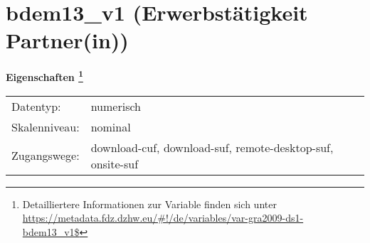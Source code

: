 
    \setcounter{footnote}{0}

    \vspace*{-1.8cm}
	\section{bdem13\_v1 (Erwerbstätigkeit Partner(in))}
	\label{section:bdem13_v1}



    \vspace*{0.5cm}
    \noindent\textbf{Eigenschaften
	\footnote{Detailliertere Informationen zur Variable finden sich unter
		\url{https://metadata.fdz.dzhw.eu/\#!/de/variables/var-gra2009-ds1-bdem13_v1$}}}\\
	\begin{tabularx}{\hsize}{@{}lX}
	Datentyp: & numerisch \\
	Skalenniveau: & nominal \\
	Zugangswege: &
	  download-cuf, 
	  download-suf, 
	  remote-desktop-suf, 
	  onsite-suf
 \\
    \end{tabularx}




